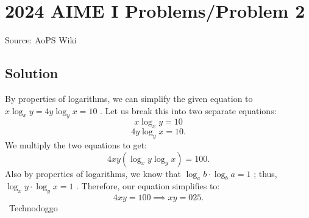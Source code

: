 \documentclass[12pt]{article}
\begin{document}
\section*{{2024 AIME I Problems/Problem 2}}
Source: AoPS Wiki

\subsection*{Solution}
By properties of logarithms, we can simplify the given equation to $x\log_xy=4y\log_yx=10$ . Let us break this into two separate equations: \[x\log_xy=10\] \[4y\log_yx=10.\] We multiply the two equations to get: \[4xy\left(\log_xy\log_yx\right)=100.\] Also by properties of logarithms, we know that $\log_ab\cdot\log_ba=1$ ; thus, $\log_xy\cdot\log_yx=1$ . Therefore, our equation simplifies to: \[4xy=100\implies xy=\boxed{025}.\] ~Technodoggo
\end{document}
